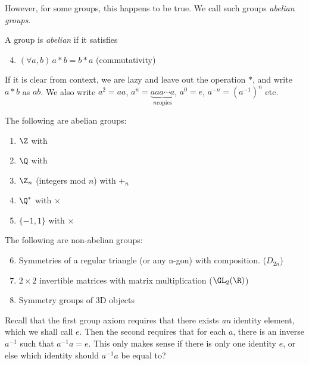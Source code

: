 \documentclass[a4paper]{article}
\begin{document}
However, for some groups, this happens to be true. We call such groups \emph{abelian groups}.
\begin{defi}
  A group is \emph{abelian} if it satisfies
  \begin{enumerate}[label=\arabic{*}.]
      \setcounter{enumi}{3}
    \item $(\forall a, b)\, a*b = b*a$ \hfill (commutativity)
  \end{enumerate}
\end{defi}
If it is clear from context, we are lazy and leave out the operation $*$, and write $a*b$ as $ab$. We also write $a^2 = aa$, $a^n = \underbrace{aaa\cdots a}_{n \text{copies}}$, $a^0 = e$, $a^{-n} = (a^{-1})^n$ etc.
\begin{eg}
  The following are abelian groups:
  \begin{enumerate}
    \item $\Z$ with
    \item $\Q$ with
    \item $\Z_n$ (integers mod $n$) with $+_n$
    \item $\Q^*$ with $\times$
    \item $\{-1, 1\}$ with $\times$
  \end{enumerate}
  The following are non-abelian groups:
  \begin{enumerate}
      \setcounter{enumi}{5}
    \item Symmetries of a regular triangle (or any n-gon) with composition. ($D_{2n}$)
    \item $2\times 2$ invertible matrices with matrix multiplication ($\GL_2(\R)$)
    \item Symmetry groups of 3D objects
  \end{enumerate}
\end{eg}

Recall that the first group axiom requires that there exists \emph{an} identity element, which we shall call $e$. Then the second requires that for each $a$, there is an inverse $a^{-1}$ such that $a^{-1}a = e$. This only makes sense if there is only one identity $e$, or else which identity should $a^{-1}a$ be equal to?
\end{document}
